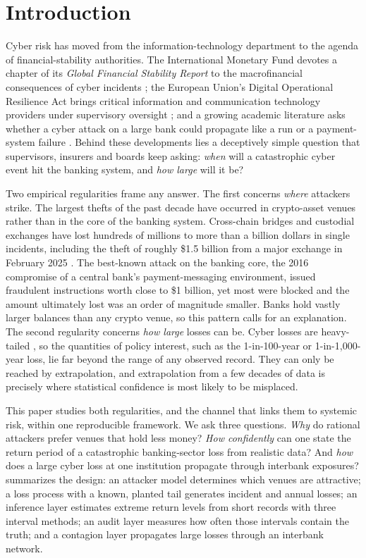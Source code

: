 \section{Introduction}\label{sec:intro}

Cyber risk has moved from the information-technology department to the agenda of financial-stability authorities. The International Monetary Fund devotes a chapter of its \emph{Global Financial Stability Report} to the macrofinancial consequences of cyber incidents \citep{imf2024}; the European Union's Digital Operational Resilience Act brings critical information and communication technology providers under supervisory oversight \citep{dora2022}; and a growing academic literature asks whether a cyber attack on a large bank could propagate like a run or a payment-system failure \citep{duffie2019,kashyap2019,eisenbach2022}. Behind these developments lies a deceptively simple question that supervisors, insurers and boards keep asking: \emph{when} will a catastrophic cyber event hit the banking system, and \emph{how large} will it be?

Two empirical regularities frame any answer. The first concerns \emph{where} attackers strike. The largest thefts of the past decade have occurred in crypto-asset venues rather than in the core of the banking system. Cross-chain bridges and custodial exchanges have lost hundreds of millions to more than a billion dollars in single incidents, including the theft of roughly \$1.5 billion from a major exchange in February 2025 \citep{fbi2025,chainalysis2025}. The best-known attack on the banking core, the 2016 compromise of a central bank's payment-messaging environment, issued fraudulent instructions worth close to \$1 billion, yet most were blocked and the amount ultimately lost was an order of magnitude smaller. Banks hold vastly larger balances than any crypto venue, so this pattern calls for an explanation. The second regularity concerns \emph{how large} losses can be. Cyber losses are heavy-tailed \citep{maillart2010,edwards2016,eling2019}, so the quantities of policy interest, such as the 1-in-100-year or 1-in-1,000-year loss, lie far beyond the range of any observed record. They can only be reached by extrapolation, and extrapolation from a few decades of data is precisely where statistical confidence is most likely to be misplaced.

This paper studies both regularities, and the channel that links them to systemic risk, within one reproducible framework. We ask three questions. \emph{Why} do rational attackers prefer venues that hold less money? \emph{How confidently} can one state the return period of a catastrophic banking-sector loss from realistic data? And \emph{how} does a large cyber loss at one institution propagate through interbank exposures?  summarizes the design: an attacker model determines which venues are attractive; a loss process with a known, planted tail generates incident and annual losses; an inference layer estimates extreme return levels from short records with three interval methods; an audit layer measures how often those intervals contain the truth; and a contagion layer propagates large losses through an interbank network.

